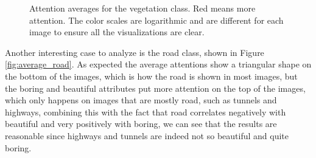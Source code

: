 \begin{figure}[ht]
{	}
	\caption[Vegetation attention averages]{
		Attention averages for the vegetation class. Red means more attention. The color
		scales are logarithmic and are different for each image to ensure all the visualizations
		are clear.
		}
\label{fig:average_vegetations}
\end{figure}

Another interesting case to analyze is the road class, shown in Figure \ref{fig:average_road}.
As expected the average attentions show a triangular shape on the bottom of the images, which
is how the road is shown in most images, but the boring and beautiful attributes put more attention
on the top of the images, which only happens on images that are mostly road, such as tunnels and
highways, combining this with the fact that road correlates negatively with beautiful and very
positively with boring, we can see that the results are reasonable since highways and tunnels are
indeed not so beautiful and quite boring.

